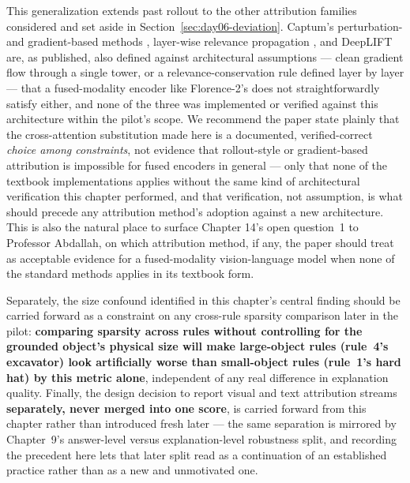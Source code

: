 This generalization extends past rollout to the other attribution families considered and set
aside in Section~\ref{sec:day06-deviation}. Captum's perturbation- and gradient-based methods
\citep{kokhlikyan2020captum}, layer-wise relevance propagation \citep{bach2015lrp}, and DeepLIFT
\citep{shrikumar2017deeplift} are, as published, also defined against architectural assumptions
--- clean gradient flow through a single tower, or a relevance-conservation rule defined layer by
layer --- that a fused-modality encoder like Florence-2's does not straightforwardly satisfy
either, and none of the three was implemented or verified against this architecture within the
pilot's scope. We recommend the paper state plainly that the cross-attention substitution made
here is a documented, verified-correct \emph{choice among constraints}, not evidence that
rollout-style or gradient-based attribution is impossible for fused encoders in general --- only
that none of the textbook implementations applies without the same kind of architectural
verification this chapter performed, and that verification, not assumption, is what should
precede any attribution method's adoption against a new architecture. This is also the natural
place to surface Chapter 14's open question~1 to Professor Abdallah, on which attribution method,
if any, the paper should treat as acceptable evidence for a fused-modality vision-language model
when none of the standard methods applies in its textbook form.

Separately, the size confound identified in this chapter's central finding should be carried
forward as a constraint on any cross-rule sparsity comparison later in the pilot:
\textbf{comparing sparsity across rules without controlling for the grounded object's physical
size will make large-object rules (rule~4's excavator) look artificially worse than small-object
rules (rule~1's hard hat) by this metric alone}, independent of any real difference in explanation
quality. Finally, the design decision to report visual and text attribution streams
\textbf{separately, never merged into one score}, is carried forward from this chapter rather
than introduced fresh later --- the same separation is mirrored by Chapter~9's answer-level versus
explanation-level robustness split, and recording the precedent here lets that later split read
as a continuation of an established practice rather than as a new and unmotivated one.
